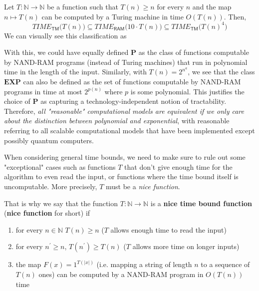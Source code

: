 \documentclass{article}
\begin{document}
  \begin{theorem}
  Let $T: \mathbb{N} \longrightarrow \mathbb{N}$ be a function such that $T(n) \geq n$ for every $n$ and the map $n \mapsto T(n)$ can be computed by a Turing machine in time $O(T(n))$. Then, 
  \[TIME_{\mathsf{TM}}\big( T(n)\big) \subseteq TIME_{\mathsf{RAM}}\big( 10 \cdot T(n)\big) \subseteq TIME_{\mathsf{TM}} \big( T(n)^4\big)\]
  We can visually see this classification as 
  \begin{center}
  \end{center}
  \end{theorem}

  With this, we could have equally defined $\mathbf{P}$ as the class of functions computable by NAND-RAM programs (instead of Turing machines) that run in polynomial time in the length of the input. Similarly, with $T(n) = 2^{n^a}$, we see that the class $\mathbf{EXP}$ can also be defined as the set of functions computable by NAND-RAM programs in time at most $2^{p(n)}$ where $p$ is some polynomial. This justifies the choice of $\mathbf{P}$ as capturing a technology-independent notion of tractability. Therefore, \textit{all "reasonable" computational models are equivalent if we only care about the distinction between polynomial and exponential}, with reasonable referring to all scalable computational models that have been implemented except possibly quantum computers. 

  When considering general time bounds, we need to make sure to rule out some "exceptional" cases such as functions $T$ that don't give enough time for the algorithm to even read the input, or functions where the time bound itself is uncomputable. More precisely, $T$ must be a \textit{nice function}. 

  \begin{definition}
  That is why we say that the function $T: \mathbb{N} \longrightarrow \mathbb{N}$ is a \textbf{nice time bound function} (\textbf{nice function} for short) if 
  \begin{enumerate}
      \item for every $n \in \mathbb{N}$ $T(n) \geq n$ ($T$ allows enough time to read the input)
      \item for every $n^\prime \geq n$, $T(n^\prime) \geq T(n)$ ($T$ allows more time on longer inputs)
      \item the map $F(x) = 1^{T(|x|)}$ (i.e. mapping a string of length $n$ to a sequence of $T(n)$ ones) can be computed by a NAND-RAM program in $O(T(n))$ time
  \end{enumerate}
  \end{definition}
\end{document}

